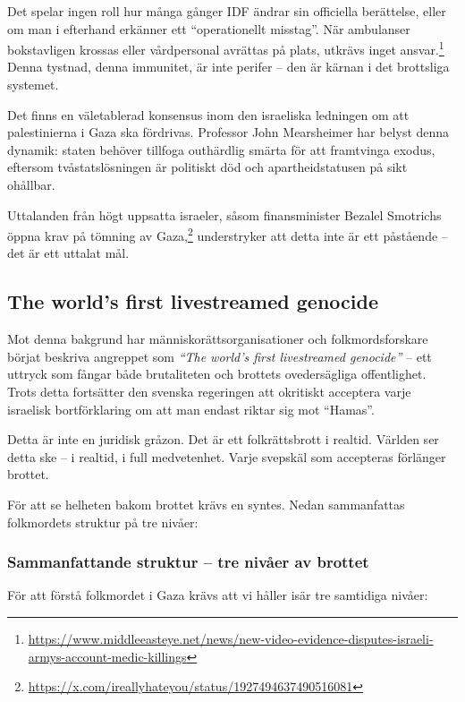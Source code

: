 \documentclass[12pt]{article}
\begin{document}
Det spelar ingen roll hur många gånger IDF ändrar sin officiella berättelse, eller om man i efterhand erkänner ett \enquote{operationellt misstag}. När ambulanser bokstavligen krossas eller vårdpersonal avrättas på plats, utkrävs inget ansvar.\footnote{\url{https://www.middleeasteye.net/news/new-video-evidence-disputes-israeli-armys-account-medic-killings}} Denna tystnad, denna immunitet, är inte perifer – den är kärnan i det brottsliga systemet.

Det finns en väletablerad konsensus inom den israeliska ledningen om att palestinierna i Gaza ska fördrivas. Professor John Mearsheimer har belyst denna dynamik: staten behöver tillfoga outhärdlig smärta för att framtvinga exodus, eftersom tvåstatslösningen är politiskt död och apartheidstatusen på sikt ohållbar.

Uttalanden från högt uppsatta israeler, såsom finansminister Bezalel Smotrichs öppna krav på tömning av Gaza,\footnote{\url{https://x.com/ireallyhateyou/status/1927494637490516081}} understryker att detta inte är ett påstående – det är ett uttalat mål.

\subsection{The world’s first livestreamed genocide}
Mot denna bakgrund har människorättsorganisationer och folkmordsforskare börjat beskriva angreppet som \textit{“The world’s first livestreamed genocide”} – ett uttryck som fångar både brutaliteten och brottets ovedersägliga offentlighet. Trots detta fortsätter den svenska regeringen att okritiskt acceptera varje israelisk bortförklaring om att man endast riktar sig mot \enquote{Hamas}.


\medskip

Detta är inte en juridisk gråzon. Det är ett folkrättsbrott i realtid.
Världen ser detta ske – i realtid, i full medvetenhet. Varje svepskäl som accepteras förlänger brottet.

\medskip

För att se helheten bakom brottet krävs en syntes. Nedan sammanfattas folkmordets struktur på tre nivåer:


\subsubsection*{Sammanfattande struktur – tre nivåer av brottet}

För att förstå folkmordet i Gaza krävs att vi håller isär tre samtidiga nivåer:
\end{document}
